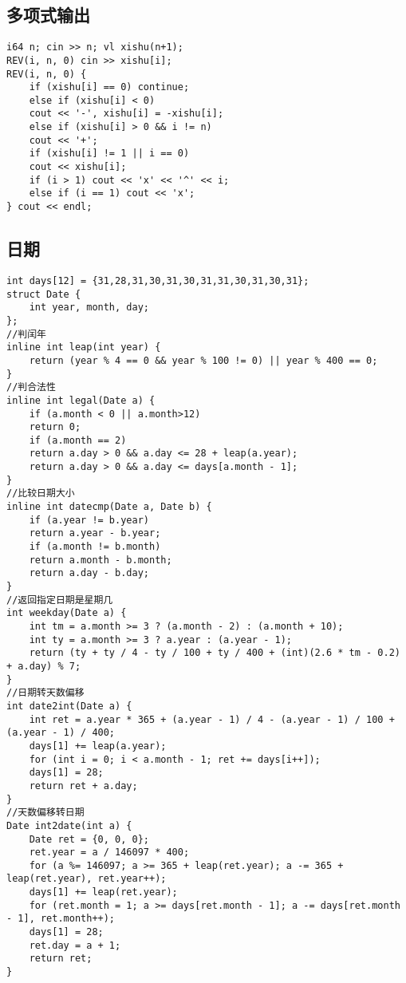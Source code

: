 \documentclass[a4paper,landscape,twocolumn]{ctexart}
\begin{document}
\subsection{多项式输出}

\begin{lstlisting}
i64 n; cin >> n; vl xishu(n+1);
REV(i, n, 0) cin >> xishu[i];
REV(i, n, 0) {
	if (xishu[i] == 0) continue;
	else if (xishu[i] < 0)
	cout << '-', xishu[i] = -xishu[i];
	else if (xishu[i] > 0 && i != n)
	cout << '+';
	if (xishu[i] != 1 || i == 0)
	cout << xishu[i];
	if (i > 1) cout << 'x' << '^' << i;
	else if (i == 1) cout << 'x';
} cout << endl;
\end{lstlisting}

\subsection{日期}

\begin{lstlisting}
int days[12] = {31,28,31,30,31,30,31,31,30,31,30,31};
struct Date {
	int year, month, day;
};
//判闰年
inline int leap(int year) {
	return (year % 4 == 0 && year % 100 != 0) || year % 400 == 0;
}
//判合法性
inline int legal(Date a) {
	if (a.month < 0 || a.month>12)
	return 0;
	if (a.month == 2)
	return a.day > 0 && a.day <= 28 + leap(a.year);
	return a.day > 0 && a.day <= days[a.month - 1];
}
//比较日期大小
inline int datecmp(Date a, Date b) {
	if (a.year != b.year)
	return a.year - b.year;
	if (a.month != b.month)
	return a.month - b.month;
	return a.day - b.day;
}
//返回指定日期是星期几
int weekday(Date a) {
	int tm = a.month >= 3 ? (a.month - 2) : (a.month + 10);
	int ty = a.month >= 3 ? a.year : (a.year - 1);
	return (ty + ty / 4 - ty / 100 + ty / 400 + (int)(2.6 * tm - 0.2) + a.day) % 7;
}
//日期转天数偏移
int date2int(Date a) {
	int ret = a.year * 365 + (a.year - 1) / 4 - (a.year - 1) / 100 + (a.year - 1) / 400;
	days[1] += leap(a.year);
	for (int i = 0; i < a.month - 1; ret += days[i++]);
	days[1] = 28;
	return ret + a.day;
}
//天数偏移转日期
Date int2date(int a) {
	Date ret = {0, 0, 0};
	ret.year = a / 146097 * 400;
	for (a %= 146097; a >= 365 + leap(ret.year); a -= 365 + leap(ret.year), ret.year++);
	days[1] += leap(ret.year);
	for (ret.month = 1; a >= days[ret.month - 1]; a -= days[ret.month - 1], ret.month++);
	days[1] = 28;
	ret.day = a + 1;
	return ret;
}
\end{lstlisting}
\end{document}
